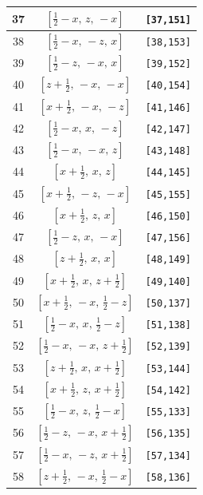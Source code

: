 \documentclass[fleqn,8pt]{jsarticle}
\begin{document}
\begin{longtable}{ccc}
37 & $\left[ \frac{1}{2} - x,\, z,\, - x \right]$ & {\tt [37,151]} \\ \hline
38 & $\left[ \frac{1}{2} - x,\, - z,\, x \right]$ & {\tt [38,153]} \\ \hline
39 & $\left[ \frac{1}{2} - z,\, - x,\, x \right]$ & {\tt [39,152]} \\ \hline
40 & $\left[ z + \frac{1}{2},\, - x,\, - x \right]$ & {\tt [40,154]} \\ \hline
41 & $\left[ x + \frac{1}{2},\, - x,\, - z \right]$ & {\tt [41,146]} \\ \hline
42 & $\left[ \frac{1}{2} - x,\, x,\, - z \right]$ & {\tt [42,147]} \\ \hline
43 & $\left[ \frac{1}{2} - x,\, - x,\, z \right]$ & {\tt [43,148]} \\ \hline
44 & $\left[ x + \frac{1}{2},\, x,\, z \right]$ & {\tt [44,145]} \\ \hline
45 & $\left[ x + \frac{1}{2},\, - z,\, - x \right]$ & {\tt [45,155]} \\ \hline
46 & $\left[ x + \frac{1}{2},\, z,\, x \right]$ & {\tt [46,150]} \\ \hline
47 & $\left[ \frac{1}{2} - z,\, x,\, - x \right]$ & {\tt [47,156]} \\ \hline
48 & $\left[ z + \frac{1}{2},\, x,\, x \right]$ & {\tt [48,149]} \\ \hline
49 & $\left[ x + \frac{1}{2},\, x,\, z + \frac{1}{2} \right]$ & {\tt [49,140]} \\ \hline
50 & $\left[ x + \frac{1}{2},\, - x,\, \frac{1}{2} - z \right]$ & {\tt [50,137]} \\ \hline
51 & $\left[ \frac{1}{2} - x,\, x,\, \frac{1}{2} - z \right]$ & {\tt [51,138]} \\ \hline
52 & $\left[ \frac{1}{2} - x,\, - x,\, z + \frac{1}{2} \right]$ & {\tt [52,139]} \\ \hline
53 & $\left[ z + \frac{1}{2},\, x,\, x + \frac{1}{2} \right]$ & {\tt [53,144]} \\ \hline
54 & $\left[ x + \frac{1}{2},\, z,\, x + \frac{1}{2} \right]$ & {\tt [54,142]} \\ \hline
55 & $\left[ \frac{1}{2} - x,\, z,\, \frac{1}{2} - x \right]$ & {\tt [55,133]} \\ \hline
56 & $\left[ \frac{1}{2} - z,\, - x,\, x + \frac{1}{2} \right]$ & {\tt [56,135]} \\ \hline
57 & $\left[ \frac{1}{2} - x,\, - z,\, x + \frac{1}{2} \right]$ & {\tt [57,134]} \\ \hline
58 & $\left[ z + \frac{1}{2},\, - x,\, \frac{1}{2} - x \right]$ & {\tt [58,136]} \\ \hline

\end{longtable}
\end{document}
